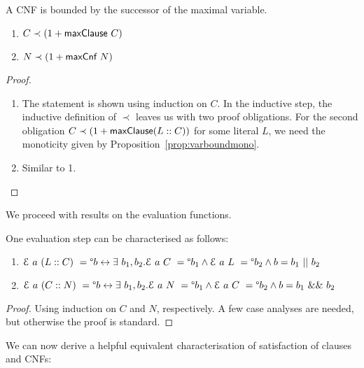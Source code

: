 \documentclass[a4paper,UKenglish,cleveref, autoref]{lipics-v2019}
\begin{document}
\begin{proposition}\label{prop:maxvarbounded}
  A CNF is bounded by the successor of the maximal variable.
  \begin{enumerate}
    \item $C \prec (1 +{\textsf{maxClause}~C})$
    \item $N \prec (1 +{\textsf{maxCnf}~N})$
  \end{enumerate}
\end{proposition}
\begin{proof}
  \begin{enumerate}
    \item The statement is shown using induction on $C$. In the inductive step, the inductive definition of $\prec$ leaves us with two proof obligations. For the second obligation $C \prec (1 +{\textsf{maxClause}(L::C)})$ for some literal $L$, we need the monoticity given by Proposition~\ref{prop:varboundmono}. 
    \item Similar to 1.
  \end{enumerate}
\end{proof}

We proceed with results on the evaluation functions.

\begin{lemma}\label{prop:evalstepinv}
  One evaluation step can be characterised as follows:
  \begin{enumerate}
    \item $\mathcal{E}~a~(L::C)~ = \degree b \leftrightarrow \exists~b_1,b_2. \mathcal{E}~a~C~ = \degree b_1 \land \mathcal{E}~a~L~ = \degree b_2 \land b = b_1~||~b_2$
    \item $\mathcal{E}~a~(C::N)~ = \degree b \leftrightarrow \exists~b_1,b_2. \mathcal{E}~a~N~ = \degree b_1 \land \mathcal{E}~a~C~ = \degree b_2 \land b = b_1~\&\&~b_2$
  \end{enumerate}
\end{lemma}
\begin{proof}
  Using induction on $C$ and $N$, respectively. A few case analyses are needed, but otherwise the proof is standard.
\end{proof}

We can now derive a helpful equivalent characterisation of satisfaction of clauses and CNFs:
\end{document}
